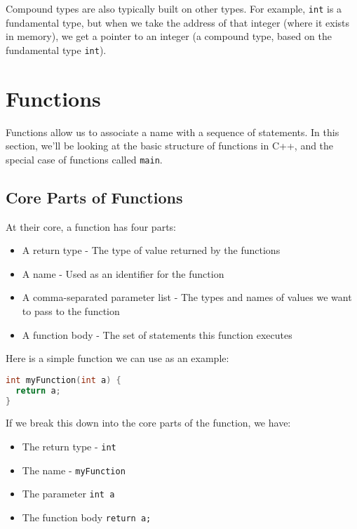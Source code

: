 \documentclass[11pt,fancy,authoryear]{elegantbook}
\begin{document}
Compound types are also typically built on other types. For example, \lstinline{int} is a fundamental type, but when we take the address of that integer (where it exists in memory), we get a pointer to an integer (a compound type, based on the fundamental type \lstinline{int}).

\section{Functions}

Functions allow us to associate a name with a sequence of statements. In this section, we'll be looking at the basic structure of functions in C++, and the special case of functions called \lstinline{main}.

\subsection{Core Parts of Functions}

At their core, a function has four parts:

\begin{itemize}
  \item A return type - The type of value returned by the functions
  \item A name - Used as an identifier for the function
  \item A comma-separated parameter list - The types and names of values we want to pass to the function
  \item A function body - The set of statements this function executes
\end{itemize}

Here is a simple function we can use as an example:

\begin{lstlisting}[language=C++]
int myFunction(int a) {
  return a;
}
\end{lstlisting}

If we break this down into the core parts of the function, we have:

\begin{itemize}
  \item The return type - \lstinline{int}
  \item The name - \lstinline{myFunction}
  \item The parameter \lstinline{int a}
  \item The function body \lstinline{return a;}
\end{itemize}
\end{document}
